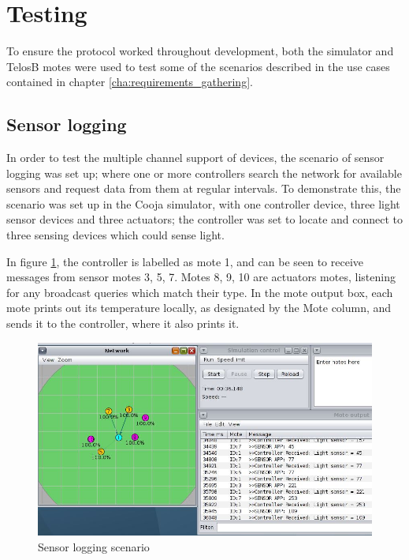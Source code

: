 \section{Testing} %
\label{sec:testing}
To ensure the protocol worked throughout development, both the simulator and TelosB motes were used to test some of the scenarios described in the use cases contained in chapter \ref{cha:requirements_gathering}.
\subsection{Sensor logging} %
\label{sub:sensor_logging}
In order to test the multiple channel support of devices, the scenario of sensor logging was set up; where one or more controllers search the network for available sensors and request data from them at regular intervals.
To demonstrate this, the scenario was set up in the Cooja simulator, with one controller device, three light sensor devices and three actuators; the controller was set to locate and connect to three sensing devices which could sense light.

In figure \ref{fig:logtest}, the controller is labelled as mote 1, and can be seen to receive messages from sensor motes 3, 5, 7. Motes 8, 9, 10 are actuators motes, listening for any broadcast queries which match their type. In the mote output box, each mote prints out its temperature locally, as designated by the Mote column, and sends it to the controller, where it also prints it.

\begin{figure}[h]
\centering
\includegraphics[scale=0.5]{evaluation/img/logTest.jpg}
\caption{Sensor logging scenario}
\label{fig:logtest}
\end{figure}  


